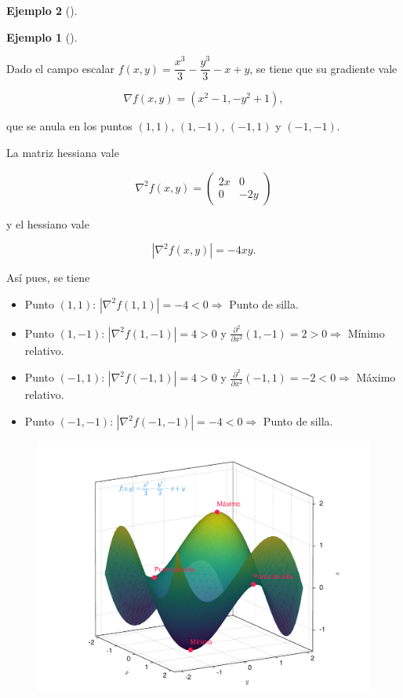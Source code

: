 \documentclass[
  a4paper,
]{scrreport}
\providecommand{\tightlist}{%
  \setlength{\itemsep}{0pt}\setlength{\parskip}{0pt}}\usepackage{longtable,booktabs,array}
\theoremstyle{definition}
\newtheorem{example}{Ejemplo}[chapter]
\theoremstyle{plain}
\theoremstyle{definition}
\theoremstyle{definition}
\theoremstyle{plain}
\theoremstyle{plain}
\theoremstyle{remark}
\begin{document}
\begin{example}[]
\begin{tcolorbox}
\end{tcolorbox}

\begin{example}[]\protect\hypertarget{exm-extremos-relativos-2}{}\label{exm-extremos-relativos-2}

Dado el campo escalar \(f(x,y)=\dfrac{x^3}{3}-\dfrac{y^3}{3}-x+y\), se
tiene que su gradiente vale

\[
\nabla f(x,y)= (x^2-1,-y^2+1),
\]

que se anula en los puntos \((1,1)\), \((1,-1)\), \((-1,1)\) y
\((-1,-1)\).

La matriz hessiana vale

\[
\nabla^2f(x,y) = \left(
\begin{array}{cc}
2x & 0\\
0 & -2y
\end{array}
\right)
\]

y el hessiano vale

\[
|\nabla^2 f(x,y)| = -4xy.
\]

Así pues, se tiene

\begin{itemize}
\tightlist
\item
  Punto \((1,1)\): \(|\nabla^2 f(1,1)| = -4 < 0 \Rightarrow\) Punto de
  silla.
\item
  Punto \((1,-1)\): \(|\nabla^2 f(1,-1)|=4>0\) y
  \(\frac{\partial^2}{\partial x^2}(1,-1)=2>0 \Rightarrow\) Mínimo
  relativo.
\item
  Punto \((-1,1)\): \(|\nabla^2 f(-1,1)|=4>0\) y
  \(\frac{\partial^2}{\partial x^2}(-1,1)=-2<0 \Rightarrow\) Máximo
  relativo.
\item
  Punto \((-1,-1)\): \(|\nabla^2 f(-1,-1)|=-4<0 \Rightarrow\) Punto de
  silla.
\end{itemize}

\begin{figure}[H]

{\centering \includegraphics{img/derivadas-funciones-varias-variables/extremos.pdf}

}
\end{figure}
\end{example}
\end{example}
\end{document}
